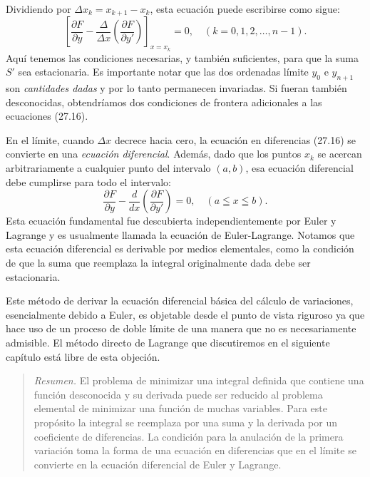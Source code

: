 \documentclass[12pt,a4paper]{book}
\begin{document}
Dividiendo por $\Delta x_k = x_{k+1} - x_k$, esta ecuación puede escribirse como sigue:
\begin{equation}
\left[ \frac{\partial F}{\partial y} - \frac{\Delta}{\Delta x} \left( \frac{\partial F}{\partial y'} \right) \right]_{x = x_k} = 0, \quad (k = 0, 1, 2, \ldots, n-1). \tag{27.16}
\end{equation}
Aquí tenemos las condiciones necesarias, y también suficientes, para que la suma $S'$ sea estacionaria. Es importante notar que las dos ordenadas límite $y_0$ e $y_{n+1}$ son \textit{cantidades dadas} y por lo tanto permanecen invariadas. Si fueran también desconocidas, obtendríamos dos condiciones de frontera adicionales a las ecuaciones (27.16).

En el límite, cuando $\Delta x$ decrece hacia cero, la ecuación en diferencias (27.16) se convierte en una \textit{ecuación diferencial}. Además, dado que los puntos $x_k$ se acercan arbitrariamente a cualquier punto del intervalo $(a, b)$, esa ecuación diferencial debe cumplirse para todo el intervalo:
\begin{equation}
\frac{\partial F}{\partial y} - \frac{d}{dx} \left( \frac{\partial F}{\partial y'} \right) = 0, \quad (a \leqq x \leqq b). \tag{27.17}
\end{equation}
Esta ecuación fundamental fue descubierta independientemente por Euler y Lagrange y es usualmente llamada la ecuación de Euler-Lagrange. Notamos que esta ecuación diferencial es derivable por medios elementales, como la condición de que la suma que reemplaza la integral originalmente dada debe ser estacionaria.

Este método de derivar la ecuación diferencial básica del cálculo de variaciones, esencialmente debido a Euler, es objetable desde el punto de vista riguroso ya que hace uso de un proceso de doble límite de una manera que no es necesariamente admisible. El método directo de Lagrange que discutiremos en el siguiente capítulo está libre de esta objeción.

\begin{quote}
\textit{Resumen.} El problema de minimizar una integral definida que contiene una función desconocida y su derivada puede ser reducido al problema elemental de minimizar una función de muchas variables. Para este propósito la integral se reemplaza por una suma y la derivada por un coeficiente de diferencias. La condición para la anulación de la primera variación toma la forma de una ecuación en diferencias que en el límite se convierte en la ecuación diferencial de Euler y Lagrange.
\end{quote}
\end{document}

